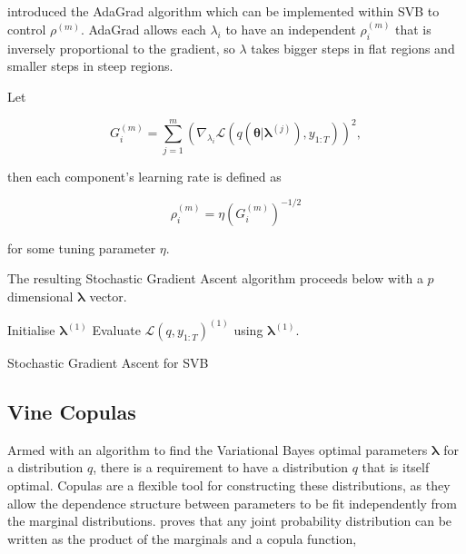 \documentclass[12pt,a4paper]{article}%
\numberwithin{equation}{section}
\begin{document}
\citet{Duchi2011} introduced the AdaGrad algorithm which can be implemented within SVB to control $\rho^{(m)}$. AdaGrad allows each $\lambda_i$ to have an independent $\rho^{(m)}_i$ that is inversely proportional to the gradient, so $\lambda$ takes bigger steps in flat regions and smaller steps in steep regions. 

Let 

\begin{equation}
\label{SGA3}
G_i^{(m)} = \sum_{j = 1}^{m} \left(\nabla_{\lambda_i}\mathcal{L}(q(\boldsymbol{\theta} | \boldsymbol{\lambda}^{(j)}), y_{1:T})\right)^2,
\end{equation}

then each component's learning rate is defined as

\begin{equation}
\label{SGA4}
\rho^{(m)}_i = \eta \left(G_i^{(m)}\right)^{-1/2}
\end{equation}

for some tuning parameter $\eta$.

The resulting Stochastic Gradient Ascent algorithm proceeds below with a $p$ dimensional $\boldsymbol{\lambda}$ vector.

\vspace{2mm}

\begin{algorithm}[H]
 Initialise $\boldsymbol{\lambda}^{(1)}$\;
 Evaluate $\mathcal{L}(q, y_{1:T})^{(1)}$ using $\boldsymbol{\lambda}^{(1)}$.\;
 \caption{Stochastic Gradient Ascent for SVB}
  \label{alg:algorithm2}
\end{algorithm}


\subsection{Vine Copulas}

Armed with an algorithm to find the Variational Bayes optimal parameters $\boldsymbol{\lambda}$ for a distribution $q$, there is a requirement to have a distribution $q$ that is itself optimal. Copulas are a flexible tool for constructing these distributions, as they allow the dependence structure between parameters to be fit independently from the marginal distributions. \citet{Sklar1959} proves that any joint probability distribution can be written as the product of the marginals and a copula function,
\end{document}
